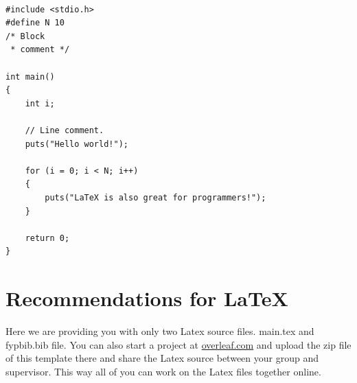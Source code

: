\documentclass{FastFyp}
\begin{document}
\begin{lstlisting}

#include <stdio.h>
#define N 10
/* Block
 * comment */

int main()
{
    int i;

    // Line comment.
    puts("Hello world!");
    
    for (i = 0; i < N; i++)
    {
        puts("LaTeX is also great for programmers!");
    }

    return 0;
}
\end{lstlisting}

\section{Recommendations for \LaTeX}
Here we are providing you with only two Latex source files.  main.tex and fypbib.bib file. You can also start a project at \url{overleaf.com} and upload the zip file of this template there and share the Latex source between your group and supervisor.  This way all of you can work on the Latex files together online.
\end{document}
